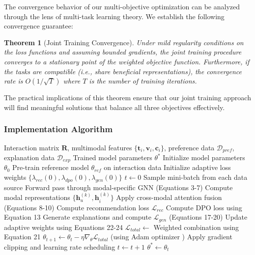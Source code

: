 \documentclass[pdflatex,sn-mathphys-num]{sn-jnl}%
\theoremstyle{thmstyleone}%
\newtheorem{theorem}{Theorem}%
\theoremstyle{thmstyletwo}%
\theoremstyle{thmstylethree}%
\begin{document}
The convergence behavior of our multi-objective optimization can be analyzed through the lens of multi-task learning theory. We establish the following convergence guarantee:

\begin{theorem}[Joint Training Convergence]
Under mild regularity conditions on the loss functions and assuming bounded gradients, the joint training procedure converges to a stationary point of the weighted objective function. Furthermore, if the tasks are compatible (i.e., share beneficial representations), the convergence rate is $O(1/\sqrt{T})$ where $T$ is the number of training iterations.
\end{theorem}

The practical implications of this theorem ensure that our joint training approach will find meaningful solutions that balance all three objectives effectively.

\subsubsection{Implementation Algorithm}

\begin{algorithm}[t]
\caption{MIG-DPG Joint Training Algorithm}
\label{alg:training}
\begin{algorithmic}[1]
\Require Interaction matrix $\mathbf{R}$, multimodal features $\{\mathbf{t}_i, \mathbf{v}_i, \mathbf{c}_i\}$, preference data $\mathcal{D}_{pref}$, explanation data $\mathcal{D}_{exp}$
\Ensure Trained model parameters $\theta^*$
\State Initialize model parameters $\theta_0$
\State Pre-train reference model $\theta_{ref}$ on interaction data
\State Initialize adaptive loss weights $\{\lambda_{rec}(0), \lambda_{dpo}(0), \lambda_{gen}(0)\}$
\State $t \leftarrow 0$
    \State Sample mini-batch from each data source
        \State Forward pass through modal-specific GNN (Equations 3-7)
        \State Compute modal representations $\{\mathbf{h}_u^{(k)}, \mathbf{h}_i^{(k)}\}$
    \EndFor
    \State Apply cross-modal attention fusion (Equations 8-10)
    \State Compute recommendation loss $\mathcal{L}_{rec}$
    \State Compute DPO loss using Equation 13
    \State Generate explanations and compute $\mathcal{L}_{gen}$ (Equations 17-20)
    \State Update adaptive weights using Equations 22-24
    \State $\mathcal{L}_{total} \leftarrow$ Weighted combination using Equation 21
    \State $\theta_{t+1} \leftarrow \theta_t - \eta \nabla_{\theta} \mathcal{L}_{total}$ (using Adam optimizer \cite{kingma2014adam})
    \State Apply gradient clipping and learning rate scheduling
    \State $t \leftarrow t + 1$
\EndWhile
\State \Return $\theta^* \leftarrow \theta_t$
\end{algorithmic}
\end{algorithm}
\end{document}
